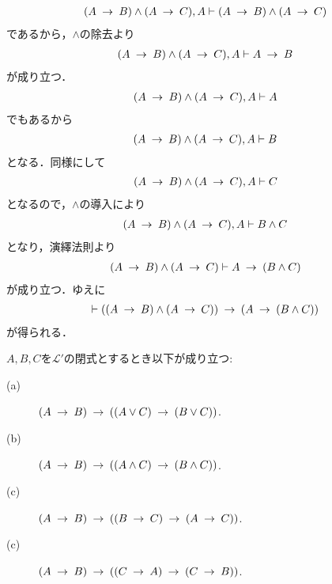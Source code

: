 	\begin{prf}
		\begin{align}
			(A \rarrow B) \wedge (A \rarrow C),A \vdash
			(A \rarrow B) \wedge (A \rarrow C)
		\end{align}
		であるから，$\wedge$の除去より
		\begin{align}
			(A \rarrow B) \wedge (A \rarrow C),A \vdash
			A \rarrow B
		\end{align}
		が成り立つ．
		\begin{align}
			(A \rarrow B) \wedge (A \rarrow C),A \vdash A
		\end{align}
		でもあるから
		\begin{align}
			(A \rarrow B) \wedge (A \rarrow C),A \vdash B
		\end{align}
		となる．同様にして
		\begin{align}
			(A \rarrow B) \wedge (A \rarrow C),A \vdash C
		\end{align}
		となるので，$\wedge$の導入により
		\begin{align}
			(A \rarrow B) \wedge (A \rarrow C),A \vdash B \wedge C
		\end{align}
		となり，演繹法則より
		\begin{align}
			(A \rarrow B) \wedge (A \rarrow C) \vdash
			A \rarrow (B \wedge C)
		\end{align}
		が成り立つ．ゆえに
		\begin{align}
			\vdash ((A \rarrow B) \wedge (A \rarrow C))
			\rarrow (A \rarrow (B \wedge C))
		\end{align}
		が得られる．
		\QED
	\end{prf}
	
	\begin{screen}
		\begin{logicalthm}[含意は遺伝する]\label{logicalthm:rule_of_inference_1}
			$A,B,C$を$\mathcal{L}'$の閉式とするとき以下が成り立つ:
			\begin{description}
				\item[(a)] $(A \rarrow B) \rarrow ( (A \vee C) \rarrow (B \vee C) )$.
				
				\item[(b)] $(A \rarrow B) \rarrow ( (A \wedge C) \rarrow (B \wedge C) )$.
				
				\item[(c)] $(A \rarrow B) \rarrow ( (B \rarrow C) \rarrow (A \rarrow C) )$.
				
				\item[(c)] $(A \rarrow B) \rarrow ( (C \rarrow A) \rarrow (C \rarrow B) )$.
			\end{description}
		\end{logicalthm}
	\end{screen}
	
